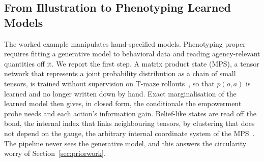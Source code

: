 \documentclass[letterpaper]{article} %
\theoremstyle{definition}
\begin{document}

\subsection{From Illustration to Phenotyping Learned Models}\label{sec:learned}
The worked example manipulates hand-specified models. Phenotyping proper requires fitting a generative model to behavioral data and reading agency-relevant quantities off it. We report the first step. A matrix product state (MPS), a tensor network that represents a joint probability distribution as a chain of small tensors, is trained without supervision on T-maze rollouts~\citep{wauthierLearningGenerative2022}, so that $p(o,a)$ is learned and no longer written down by hand. Exact marginalisation of the learned model then gives, in closed form, the conditionals the empowerment probe needs and each action's information gain. Belief-like states are read off the bond, the internal index that links neighbouring tensors, by clustering that does not depend on the gauge, the arbitrary internal coordinate system of the MPS~\citep{aizpuruaTensorExplainable2024,ranTensorNetworkInterpretable2023}. The pipeline never sees the generative model, and this answers the circularity worry of Section~\ref{sec:priorwork}.
\end{document}
